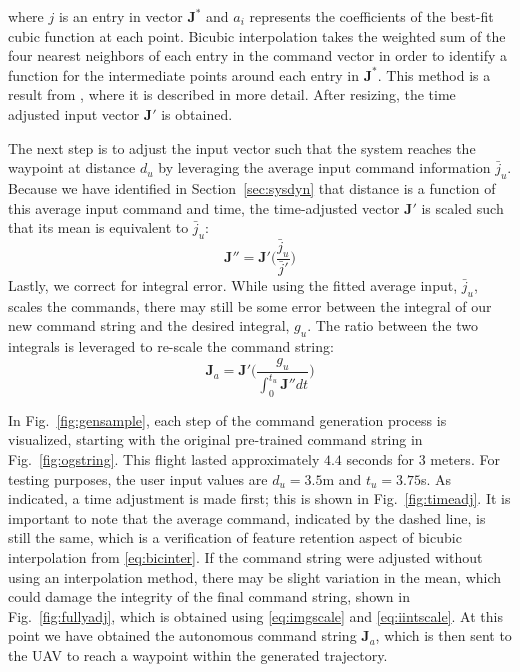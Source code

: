 \documentclass[letterpaper, 10 pt, conference]{ieeeconf}  %
\newcommand\NB[1]{$\spadesuit$\footnote{NB: #1}}
\begin{document}
where $j$ is an entry in vector $\bm{J}^*$ and $a_i$ represents the coefficients of the best-fit cubic function at each point. %
Bicubic interpolation takes the weighted sum of the four nearest neighbors of each entry in the command vector in order to identify a function for the intermediate points around each entry in $\bm{J}^*$. This method is a result from \cite{bicfeatures}, where it is described in more detail. After resizing, the time adjusted input vector $\bm{J}'$ is obtained.

The next step is to adjust the input vector such that the system reaches the waypoint at distance $d_u$ by leveraging the average input command information $\bar{j}_u$. Because we have identified in Section~\ref{sec:sysdyn} that distance is a function of this average input command and time, the time-adjusted vector $\bm{J}'$ is scaled such that its mean is equivalent to $\bar{j}_u$:
\begin{equation} \label{eq:imgscale}
\bm{J}'' = \bm{J}'\bigg(\frac{\bar{j}_u}{\bar{j}'}\bigg)
\end{equation}
Lastly, we correct for integral error. While using the fitted average input, $\bar{j}_u$, scales the commands, there may still be some error between the integral of our new command string and the desired integral, $g_u$. The ratio between the two integrals is leveraged to re-scale the command string:
\begin{equation} \label{eq:iintscale}
\bm{J}_a = \bm{J}'\bigg(\frac{g_u}{\int_0^{t_u}\bm{J}''dt}\bigg)
\end{equation}


In Fig.~\ref{fig:gensample}, each step of the command generation process is visualized, starting with the original pre-trained command string in Fig.~\ref{fig:ogstring}. This flight lasted approximately $4.4$ seconds for $3$ meters. For testing purposes, the user input values are $d_u=3.5$m and $t_u=3.75$s. As indicated, a time adjustment is made first; this is shown in Fig.~\ref{fig:timeadj}. It is important to note that the average command, indicated by the dashed line, is still the same, which is a verification of feature retention aspect of bicubic interpolation from \eqref{eq:bicinter}. If the command string were adjusted without using an interpolation method, there may be slight variation in the mean, which could damage the integrity of the final command string, shown in Fig.~\ref{fig:fullyadj}, which is obtained using \eqref{eq:imgscale} and \eqref{eq:iintscale}. At this point we have obtained the autonomous command string $\bm{J}_a$, which is then sent to the UAV to reach a waypoint within the generated trajectory.
\end{document}
